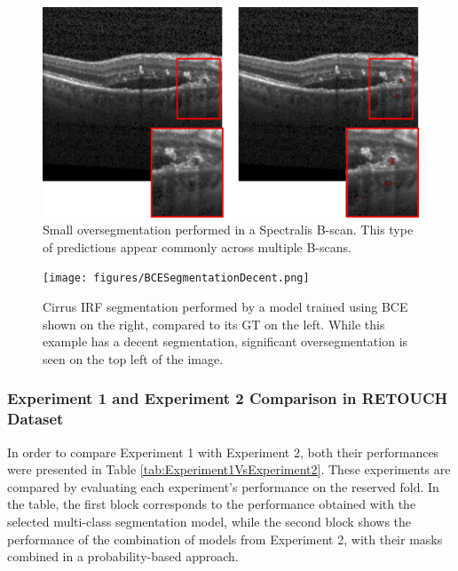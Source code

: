 \begin{figure}[!ht]
	\centering
	\includegraphics[width=0.8\linewidth]{figures/BCESegmentationError.png}
	\caption{Small oversegmentation performed in a Spectralis B-scan. This type of predictions appear commonly across multiple B-scans.}
	\label{fig:BCESegmentationError}
\end{figure}

\begin{figure}[!ht]
	\centering
	\texttt{[image: figures/BCESegmentationDecent.png]}
	\caption{Cirrus IRF segmentation performed by a model trained using BCE shown on the right, compared to its GT on the left. While this example has a decent segmentation, significant oversegmentation is seen on the top left of the image.}
	\label{fig:BCESegmentationDecent}
\end{figure}

\subsubsection{Experiment 1 and Experiment 2 Comparison in RETOUCH Dataset}

In order to compare Experiment 1 with Experiment 2, both their performances were presented in Table \ref{tab:Experiment1VsExperiment2}. These experiments are compared by evaluating each experiment's performance on the reserved fold. In the table, the first block corresponds to the performance obtained with the selected multi-class segmentation model, while the second block shows the performance of the combination of models from Experiment 2, with their masks combined in a probability-based approach.

